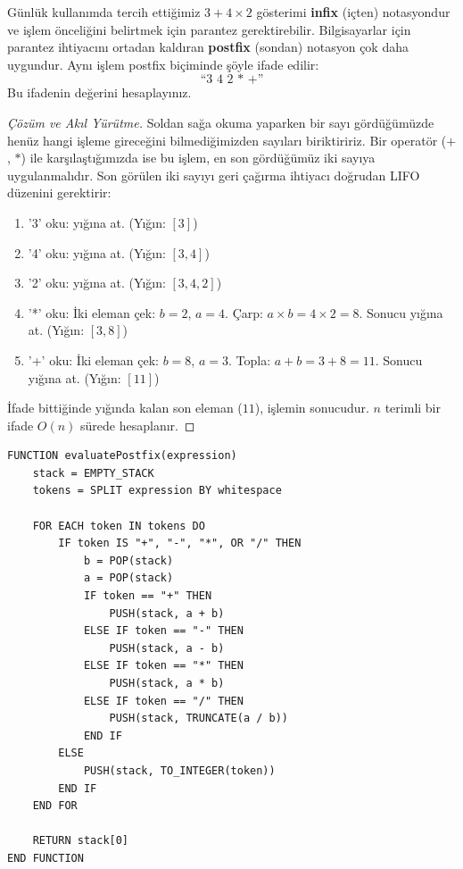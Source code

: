 \begin{example}
Günlük kullanımda tercih ettiğimiz $3 + 4 \times 2$ gösterimi \textbf{infix} (içten) notasyondur ve işlem önceliğini belirtmek için parantez gerektirebilir. Bilgisayarlar için parantez ihtiyacını ortadan kaldıran \textbf{postfix} (sondan) notasyon çok daha uygundur. Aynı işlem postfix biçiminde şöyle ifade edilir:
\[ \text{``3 4 2 * +''} \]
Bu ifadenin değerini hesaplayınız.
\end{example}

\begin{proof}[Çözüm ve Akıl Yürütme]
Soldan sağa okuma yaparken bir sayı gördüğümüzde henüz hangi işleme gireceğini bilmediğimizden sayıları biriktiririz. Bir operatör ($+$, $*$) ile karşılaştığımızda ise bu işlem, en son gördüğümüz iki sayıya uygulanmalıdır. Son görülen iki sayıyı geri çağırma ihtiyacı doğrudan LIFO düzenini gerektirir:
\begin{enumerate}
    \item '3' oku: yığına at. (Yığın: $[3]$)
    \item '4' oku: yığına at. (Yığın: $[3, 4]$)
    \item '2' oku: yığına at. (Yığın: $[3, 4, 2]$)
    \item '*' oku: İki eleman çek: $b = 2$, $a = 4$. Çarp: $a \times b = 4 \times 2 = 8$. Sonucu yığına at. (Yığın: $[3, 8]$)
    \item '+' oku: İki eleman çek: $b = 8$, $a = 3$. Topla: $a + b = 3 + 8 = 11$. Sonucu yığına at. (Yığın: $[11]$)
\end{enumerate}
İfade bittiğinde yığında kalan son eleman ($11$), işlemin sonucudur. $n$ terimli bir ifade $O(n)$ sürede hesaplanır.
\end{proof}

\begin{lstlisting}
FUNCTION evaluatePostfix(expression)
    stack = EMPTY_STACK
    tokens = SPLIT expression BY whitespace

    FOR EACH token IN tokens DO
        IF token IS "+", "-", "*", OR "/" THEN
            b = POP(stack)
            a = POP(stack)
            IF token == "+" THEN
                PUSH(stack, a + b)
            ELSE IF token == "-" THEN
                PUSH(stack, a - b)
            ELSE IF token == "*" THEN
                PUSH(stack, a * b)
            ELSE IF token == "/" THEN
                PUSH(stack, TRUNCATE(a / b))
            END IF
        ELSE
            PUSH(stack, TO_INTEGER(token))
        END IF
    END FOR

    RETURN stack[0]
END FUNCTION\end{lstlisting}

